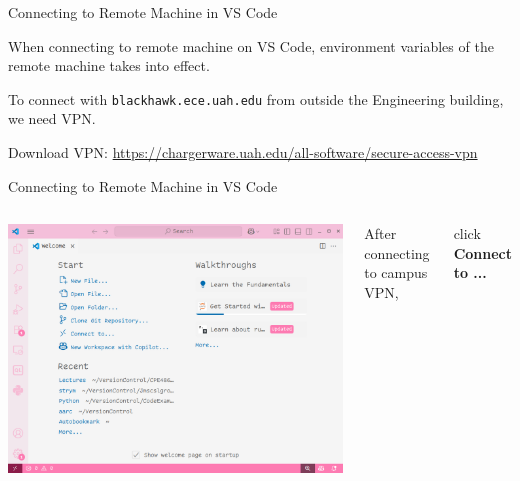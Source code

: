 \documentclass[aspectratio=169,xcolor=dvipsnames,svgnames,x11names,fleqn]{beamer}
\begin{document}
\begin{frame}{Connecting to Remote Machine in VS Code}

    When connecting to remote machine on VS Code, environment variables of the remote machine takes into effect.

    \vspace{10pt}

    To connect with \texttt{blackhawk.ece.uah.edu} from outside the Engineering building, we need VPN.

    \vspace{10pt}

    Download VPN: \url{https://chargerware.uah.edu/all-software/secure-access-vpn}

    
\end{frame}

\begin{frame}{Connecting to Remote Machine in VS Code}

    \footnotesize
\begin{columns}
\begin{center}
    \includegraphics[width=\textwidth,height=0.75\textheight,keepaspectratio]{figures/VSCode_HomePage.png}
\end{center}


    After connecting to campus VPN,
    
    click \textbf{Connect to ...}
    
\end{columns}
\end{frame}
\end{document}
